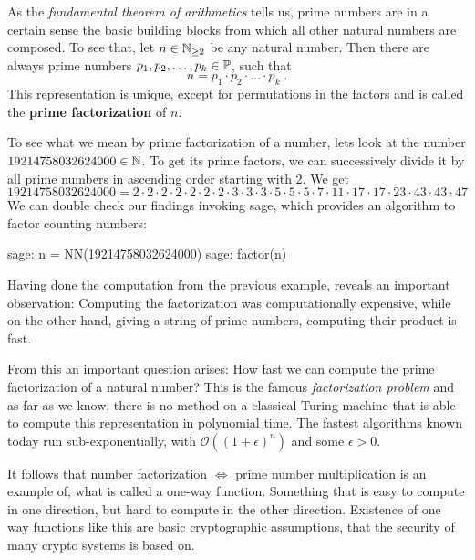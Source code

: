 As the \textit{fundamental theorem of arithmetics} tells us, prime numbers are in a certain sense the basic building blocks from which all other natural numbers are composed. To see that, let $ n \in \mathbb{N}_{\geq 2} $ be any natural number. Then there are always prime numbers $ p_1, p_2, \ldots, p_k \in \mathbb{P} $, such that
\begin{equation}
n = p_1 \cdot p_2 \cdot \ldots \cdot p_k \;.
\end{equation}
This representation is unique, except for permutations in the factors and is called the \textbf{prime factorization} of $n$.
\begin{example} To see what we mean by prime factorization of a number, lets look at the number $19214758032624000\in\mathbb{N}$. To get its prime factors, we can successively divide it by all prime numbers in ascending order starting with $2$. We get
\begin{equation*}
19214758032624000 = 2\cdot 2\cdot 2\cdot 2\cdot 2\cdot 2\cdot 2 \cdot 3\cdot 3\cdot 3\cdot 5\cdot 5\cdot 5\cdot 7 \cdot 11 \cdot 17\cdot 17 \cdot 23 \cdot 43\cdot 43 \cdot 47
\end{equation*}
We can double check our findings invoking sage, which provides an algorithm to factor counting numbers:
\begin{sagecommandline}
sage: n = NN(19214758032624000)
sage: factor(n)
\end{sagecommandline}
\end{example}
Having done the computation from the previous example, reveals an important observation: Computing the factorization was computationally expensive, while on the other hand, giving a string of prime numbers, computing their product is fast. 

From this an important question arises: How fast we can compute the prime factorization of a natural number? This is the famous \textit{factorization problem} and as far as we know, there is no method on a classical Turing machine that is able to compute this representation in polynomial time. The fastest algorithms known today run sub-exponentially, with $\mathcal{O}((1+ \epsilon)^n)$ and some $ \epsilon> 0 $.

It follows that number factorization $\Leftrightarrow$ prime number multiplication is an example of, what is called a one-way function. Something that is easy to compute in one direction, but hard to compute in the other direction. Existence of one way functions like this are basic cryptographic assumptions, that the security of many crypto systems is based on.

